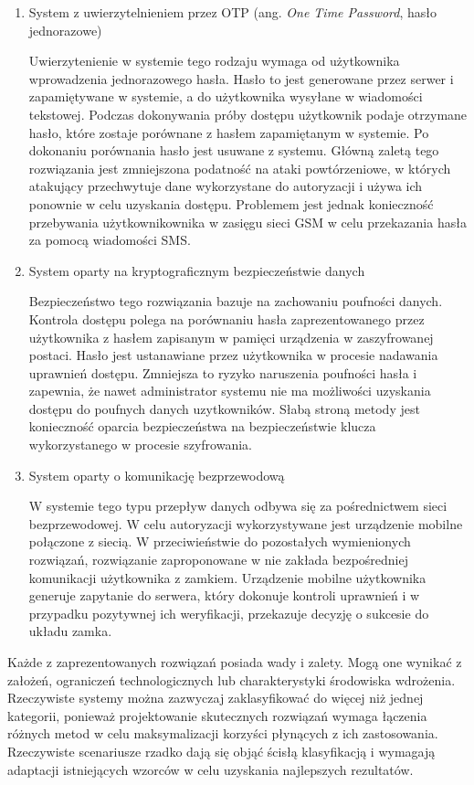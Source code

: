 \begin{enumerate}[label=\Alph*.]
			\item System z uwierzytelnieniem przez OTP (ang. \textit{One Time Password}, hasło jednorazowe)

				Uwierzytenienie w systemie tego rodzaju wymaga od użytkownika wprowadzenia jednorazowego hasła. Hasło to jest generowane przez serwer i zapamiętywane w systemie, a do użytkownika wysyłane w wiadomości tekstowej. Podczas dokonywania próby dostępu użytkownik podaje otrzymane hasło, które zostaje porównane z hasłem zapamiętanym w systemie. Po dokonaniu porównania hasło jest usuwane z systemu. Główną zaletą tego rozwiązania jest zmniejszona podatność na ataki powtórzeniowe, w których atakujący przechwytuje dane wykorzystane do autoryzacji i używa ich ponownie w celu uzyskania dostępu. Problemem jest jednak konieczność przebywania użytkownikownika w zasięgu sieci GSM w celu przekazania hasła za pomocą wiadomości SMS.

			\item System oparty na kryptograficznym bezpieczeństwie danych

				Bezpieczeństwo tego rozwiązania bazuje na zachowaniu poufności danych. Kontrola dostępu polega na porównaniu hasła zaprezentowanego przez użytkownika z hasłem zapisanym w pamięci urządzenia w zaszyfrowanej postaci. Hasło jest ustanawiane przez użytkownika w procesie nadawania uprawnień dostępu. Zmniejsza to ryzyko naruszenia poufności hasła i zapewnia, że nawet administrator systemu nie ma możliwości uzyskania dostępu do poufnych danych uzytkowników. Słabą stroną metody jest konieczność oparcia bezpieczeństwa na bezpieczeństwie klucza wykorzystanego w procesie szyfrowania.

			\item System oparty o komunikację bezprzewodową

				W systemie tego typu przepływ danych odbywa się za pośrednictwem sieci bezprzewodowej. W celu autoryzacji wykorzystywane jest urządzenie mobilne połączone z siecią. W przeciwieństwie do pozostałych wymienionych rozwiązań, rozwiązanie zaproponowane w \cite{cryptographic-iot-access-system} nie zakłada bezpośredniej komunikacji użytkownika z zamkiem. Urządzenie mobilne użytkownika generuje zapytanie do serwera, który dokonuje kontroli uprawnień i w przypadku pozytywnej ich weryfikacji, przekazuje decyzję o sukcesie do układu zamka.
		\end{enumerate}

		Każde z zaprezentowanych rozwiązań posiada wady i zalety. Mogą one wynikać z założeń, ograniczeń technologicznych lub charakterystyki środowiska wdrożenia. Rzeczywiste systemy można zazwyczaj zaklasyfikować do więcej niż jednej kategorii, ponieważ projektowanie skutecznych rozwiązań wymaga łączenia różnych metod w celu maksymalizacji korzyści płynących z ich zastosowania. Rzeczywiste scenariusze rzadko dają się objąć ścisłą klasyfikacją i wymagają adaptacji istniejących wzorców w celu uzyskania najlepszych rezultatów.

